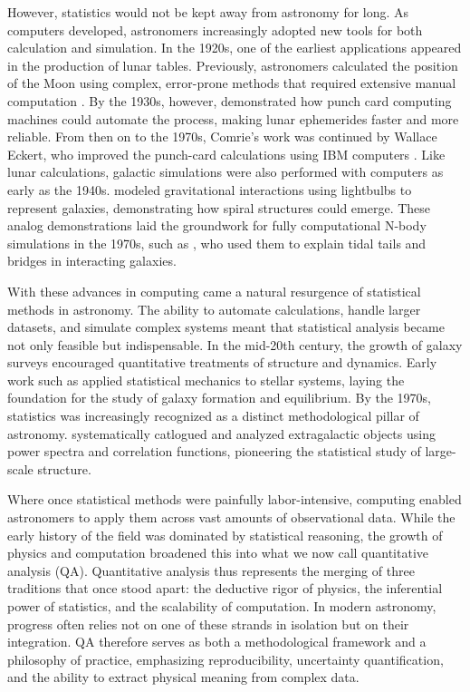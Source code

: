\documentclass[preprint,longauthor]{aastex631}
\numberwithin{equation}{section}
\begin{document}
However, statistics would not be kept away from astronomy for long. As computers developed, astronomers increasingly adopted new tools for both calculation and simulation. In the 1920s, one of the earliest applications appeared in the production of lunar tables. Previously, astronomers calculated the position of the Moon using complex, error-prone methods that required extensive manual computation \citep{duncombeEarlyApplicationsComputer1988}. By the 1930s, however, \citet{comrieApplicationHollerithTabulating1932} demonstrated how punch card computing machines could automate the process, making lunar ephemerides faster and more reliable. From then on to the 1970s, Comrie's work was continued by Wallace Eckert, who improved the punch-card calculations using IBM computers \citep{olleyTaskThatExceeded2018}. Like lunar calculations, galactic simulations were also performed with computers as early as the 1940s. \citet{holmbergClusteringTendenciesNebulae1940} modeled gravitational interactions using lightbulbs to represent galaxies, demonstrating how spiral structures could emerge. These analog demonstrations laid the groundwork for fully computational N-body simulations in the 1970s, such as \citet{toomreGalacticBridgesTails1972}, who used them to explain tidal tails and bridges in interacting galaxies.

With these advances in computing came a natural resurgence of statistical methods in astronomy. The ability to automate calculations, handle larger datasets, and simulate complex systems meant that statistical analysis became not only feasible but indispensable. In the mid-20th century, the growth of galaxy surveys encouraged quantitative treatments of structure and dynamics. Early work such as \citet{lynden-bellStatisticalMechanicsViolent1967} applied statistical mechanics to stellar systems, laying the foundation for the study of galaxy formation and equilibrium. By the 1970s, statistics was increasingly recognized as a distinct methodological pillar of astronomy. \citet{peeblesStatisticalAnalysisCatalogs1973} systematically catlogued and analyzed extragalactic objects using power spectra and correlation functions, pioneering the statistical study of large-scale structure.

Where once statistical methods were painfully labor-intensive, computing enabled astronomers to apply them across vast amounts of observational data. While the early history of the field was dominated by statistical reasoning, the growth of physics and computation broadened this into what we now call quantitative analysis (QA). Quantitative analysis thus represents the merging of three traditions that once stood apart: the deductive rigor of physics, the inferential power of statistics, and the scalability of computation. In modern astronomy, progress often relies not on one of these strands in isolation but on their integration. QA therefore serves as both a methodological framework and a philosophy of practice, emphasizing reproducibility, uncertainty quantification, and the ability to extract physical meaning from complex data.
\end{document}
